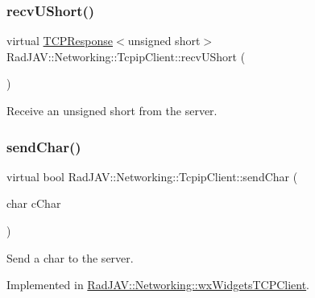 \mbox{\label{class_rad_j_a_v_1_1_networking_1_1_tcpip_client_a85dd74424b331ea12115a2f85a9d2d5b}} 
\subsubsection{\texorpdfstring{recv\+U\+Short()}{recvUShort()}}
{\footnotesize\ttfamily virtual \mbox{\hyperlink{class_rad_j_a_v_1_1_networking_1_1_t_c_p_response}{T\+C\+P\+Response}}$<$unsigned short$>$ Rad\+J\+A\+V\+::\+Networking\+::\+Tcpip\+Client\+::recv\+U\+Short (\begin{DoxyParamCaption}{ }\end{DoxyParamCaption})\hspace{0.3cm}{\ttfamily [pure virtual]}}



Receive an unsigned short from the server. 

\mbox{\label{class_rad_j_a_v_1_1_networking_1_1_tcpip_client_a03068a5be5c7a1482aacf0c706ad3d9d}} 
\subsubsection{\texorpdfstring{send\+Char()}{sendChar()}}
{\footnotesize\ttfamily virtual bool Rad\+J\+A\+V\+::\+Networking\+::\+Tcpip\+Client\+::send\+Char (\begin{DoxyParamCaption}\item[{char}]{c\+Char }\end{DoxyParamCaption})\hspace{0.3cm}{\ttfamily [pure virtual]}}



Send a char to the server. 



Implemented in \mbox{\hyperlink{class_rad_j_a_v_1_1_networking_1_1wx_widgets_t_c_p_client_a3fdaa69183625a5555d99da0a32c6700}{Rad\+J\+A\+V\+::\+Networking\+::wx\+Widgets\+T\+C\+P\+Client}}.

